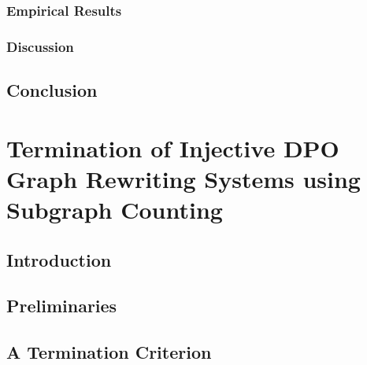 \documentclass{report}
\begin{document}
\subsection{Empirical Results}
\label{sec:type_graph:result}
 

\subsection{Discussion}
\label{sec:type_graph:related_work}


\section{Conclusion}
\label{sec:type_graph:conclusion}


\chapter{Termination of Injective DPO Graph Rewriting
Systems using Subgraph Counting}
\label{chap:subgraph_counting}
\section{Introduction}
\label{sec:intro}

\section{Preliminaries} 
\label{sec:pre} 


% 

% 
   
\section{A Termination Criterion} 
\label{sec:termination_criterion}
 
 
\end{document}
